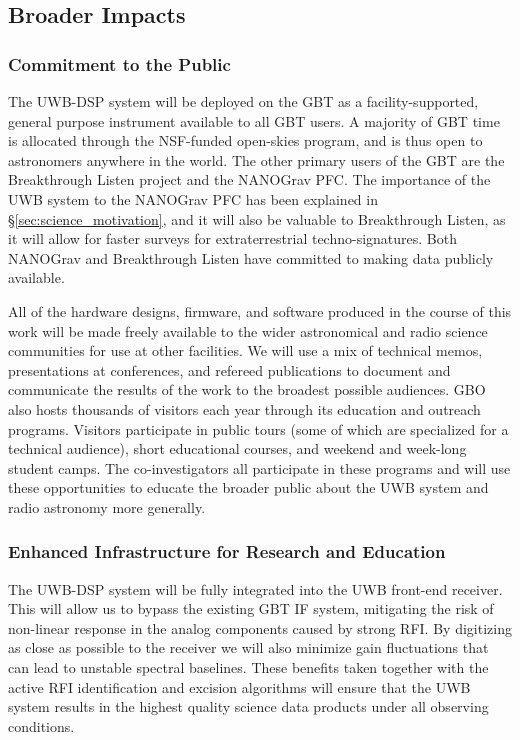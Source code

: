 \documentclass[10pt]{myNSF}
\begin{document}
\subsection{Broader Impacts}
\label{sec:BI}

\subsubsection{Commitment to the Public}
\label{sec:commitment}

The UWB-DSP system will be deployed on the GBT as a
facility-supported, general purpose instrument available to all GBT
users.  A majority of GBT time is allocated through the NSF-funded
open-skies program, and is thus open to astronomers anywhere in the
world.  The other primary users of the GBT are the Breakthrough Listen
project and the NANOGrav PFC.  The importance of the UWB system to the
NANOGrav PFC has been explained in \S\ref{sec:science_motivation}, and
it will also be valuable to Breakthrough Listen, as it will allow for
faster surveys for extraterrestrial techno-signatures.  Both NANOGrav
and Breakthrough Listen have committed to making data publicly
available.

All of the hardware designs, firmware, and software produced in the
course of this work will be made freely available to the wider
astronomical and radio science communities for use at other
facilities.  We will use a mix of technical memos, presentations at
conferences, and refereed publications to document and communicate the
results of the work to the broadest possible audiences.  GBO also
hosts thousands of visitors each year through its education and
outreach programs.  Visitors participate in public tours (some of
which are specialized for a technical audience), short educational
courses, and weekend and week-long student camps.  The
co-investigators all participate in these programs and will use these
opportunities to educate the broader public about the UWB system and
radio astronomy more generally.

\subsubsection{Enhanced Infrastructure for Research and Education}
\label{sec:infrastructure}


The UWB-DSP system will be fully integrated into the UWB front-end
receiver.  This will allow us to bypass the existing GBT IF system,
mitigating the risk of non-linear response in the analog components
caused by strong RFI.  By digitizing as close as possible to the
receiver we will also minimize gain fluctuations that can lead to
unstable spectral baselines.  These benefits taken together with the
active RFI identification and excision algorithms will ensure that the
UWB system results in the highest quality science data products under
all observing conditions.
\end{document}
